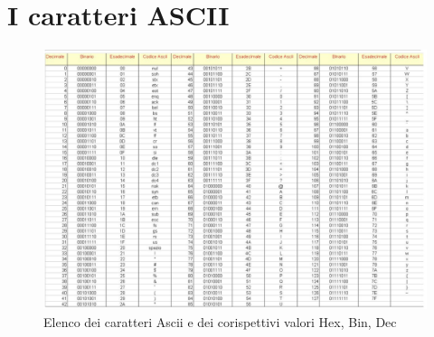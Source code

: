 
\chapter{I caratteri ASCII}

\begin{figure}[ht!]
\centering
\includegraphics[width=175mm, angle=90]{Appendici/Contenuti/asciiTab.jpg}
\caption{Elenco dei caratteri Ascii e dei corispettivi valori Hex, Bin, Dec \label{fig:tabellaAscii}}
\end{figure}